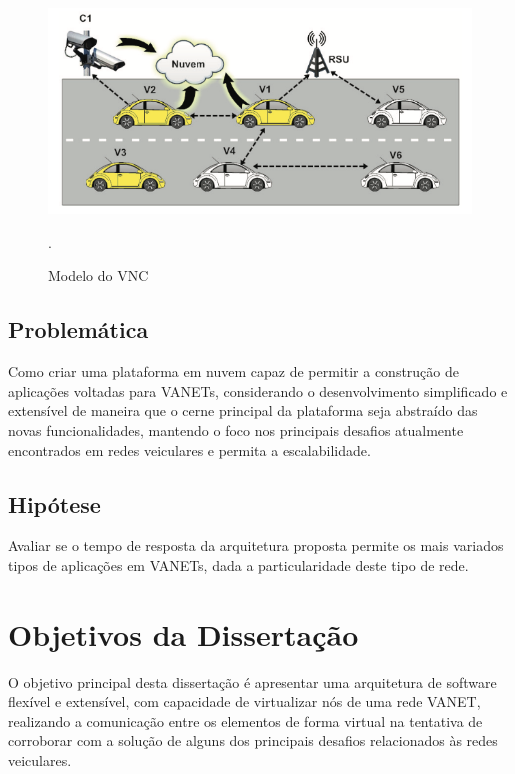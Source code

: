 \documentclass[
	12pt,				%
	oneside,			%
	a4paper,			%
	english,			%
	brazil				%
	]{abntex2ppgsi}
\begin{document}
\begin{figure}[h!]
	\centering
	\includegraphics[width=0.7\columnwidth]{images/vcn.png}
	\caption{Modelo do VNC \cite{lee2014vehicular}}.
	\label{fig:vcn}
\end{figure}

%

\subsection{Problemática}

Como criar uma plataforma em nuvem capaz de permitir a construção de aplicações voltadas para VANETs, considerando o desenvolvimento simplificado e extensível de maneira que o cerne principal da plataforma seja abstraído das novas funcionalidades, mantendo o foco nos principais desafios atualmente encontrados em redes veiculares e permita a escalabilidade. 

\subsection{Hipótese}

Avaliar se o tempo de resposta da arquitetura proposta permite os mais variados tipos de aplicações em VANETs, dada a particularidade deste tipo de rede.

\section{Objetivos da Dissertação}

O objetivo principal desta dissertação é apresentar uma arquitetura de software flexível e extensível, com capacidade de virtualizar nós de uma rede VANET, realizando a comunicação entre os elementos de forma virtual na tentativa de corroborar com a solução de alguns dos principais desafios relacionados às redes veiculares.
\end{document}
